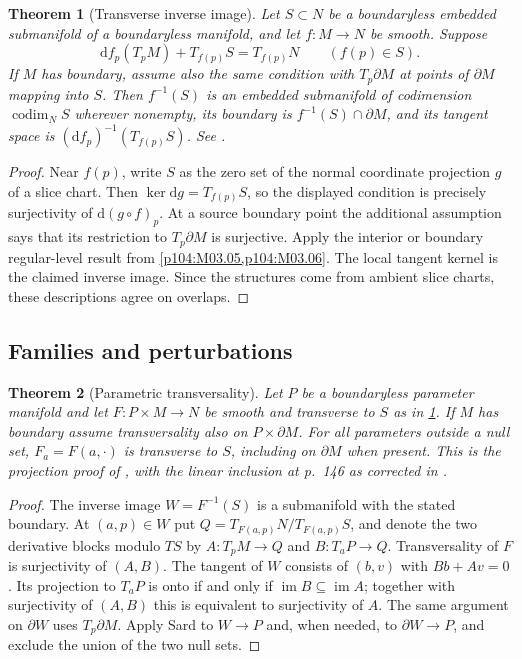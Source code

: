 \documentclass[11pt,oneside,openany]{book}
\newtheorem{theorem}{Theorem}[chapter]
\theoremstyle{definition}
\theoremstyle{remark}
\newcommand{\dd}{\mathrm d}
\begin{document}
\begin{theorem}[Transverse inverse image]\label{p104:M04.06}
Let \(S\subset N\) be a boundaryless embedded submanifold of a boundaryless manifold, and let \(f:M\to N\) be smooth. Suppose
\[
 \dd f_p(T_pM)+T_{f(p)}S=T_{f(p)}N
 \qquad(f(p)\in S).
\]
If \(M\) has boundary, assume also the same condition with \(T_p\partial M\) at points of \(\partial M\) mapping into \(S\). Then \(f^{-1}(S)\) is an embedded submanifold of codimension \(\operatorname{codim}_N S\) wherever nonempty, its boundary is \(f^{-1}(S)\cap\partial M\), and its tangent space is \((\dd f_p)^{-1}(T_{f(p)}S)\). See \cite[Theorem 6.30 and Problem 5-23]{lee}.
\end{theorem}
\begin{proof}
Near \(f(p)\), write \(S\) as the zero set of the normal coordinate projection \(g\) of a slice chart. Then \(\ker\dd g=T_{f(p)}S\), so the displayed condition is precisely surjectivity of \(\dd(g\circ f)_p\). At a source boundary point the additional assumption says that its restriction to \(T_p\partial M\) is surjective. Apply the interior or boundary regular-level result from \cref{p104:M03.05,p104:M03.06}. The local tangent kernel is the claimed inverse image. Since the structures come from ambient slice charts, these descriptions agree on overlaps.
\end{proof}

\subsection{Families and perturbations}

\begin{theorem}[Parametric transversality]\label{p104:M04.07}
Let \(P\) be a boundaryless parameter manifold and let \(F:P\times M\to N\) be smooth and transverse to \(S\) as in \cref{p104:M04.06}. If \(M\) has boundary assume transversality also on \(P\times\partial M\). For all parameters outside a null set, \(F_a=F(a,\cdot)\) is transverse to \(S\), including on \(\partial M\) when present. This is the projection proof of \cite[Theorem 6.35]{lee}, with the linear inclusion at p.\ 146 as corrected in \cite{leeerrata}.
\end{theorem}
\begin{proof}
The inverse image \(W=F^{-1}(S)\) is a submanifold with the stated boundary. At \((a,p)\in W\) put \(Q=T_{F(a,p)}N/T_{F(a,p)}S\), and denote the two derivative blocks modulo \(T S\) by \(A:T_pM\to Q\) and \(B:T_aP\to Q\). Transversality of \(F\) is surjectivity of \((A,B)\). The tangent of \(W\) consists of \((b,v)\) with \(B b+A v=0\). Its projection to \(T_aP\) is onto if and only if \(\operatorname{im}B\subseteq\operatorname{im}A\); together with surjectivity of \((A,B)\) this is equivalent to surjectivity of \(A\). The same argument on \(\partial W\) uses \(T_p\partial M\). Apply Sard to \(W\to P\) and, when needed, to \(\partial W\to P\), and exclude the union of the two null sets.
\end{proof}
\end{document}
